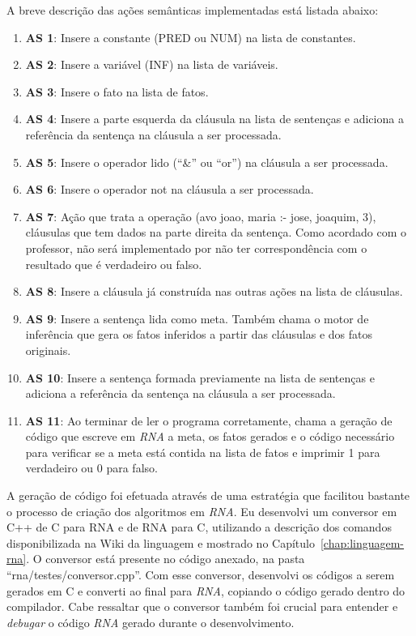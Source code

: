A breve descrição das ações semânticas implementadas está listada abaixo:

\begin{enumerate}
	\item \textbf{AS 1}: Insere a constante (PRED ou NUM) na lista de constantes.
	\item \textbf{AS 2}: Insere a variável (INF) na lista de variáveis.
	\item \textbf{AS 3}: Insere o fato na lista de fatos.
	\item \textbf{AS 4}: Insere a parte esquerda da cláusula na lista de sentenças e adiciona a referência da sentença na cláusula a ser processada.
	\item \textbf{AS 5}: Insere o operador lido (``\&'' ou ``or'') na cláusula a ser processada.
	\item \textbf{AS 6}: Insere o operador not na cláusula a ser processada.
	\item \textbf{AS 7}: Ação que trata a operação (avo joao, maria :- jose, joaquim, 3), cláusulas que tem dados na parte direita da sentença. Como acordado com o professor, não será implementado por não ter correspondência com o resultado que é verdadeiro ou falso.
	\item \textbf{AS 8}: Insere a cláusula já construída nas outras ações na lista de cláusulas.
	\item \textbf{AS 9}: Insere a sentença lida como meta. Também chama o motor de inferência que gera os fatos inferidos a partir das cláusulas e dos fatos originais.
	\item \textbf{AS 10}: Insere a sentença formada previamente na lista de sentenças e adiciona a referência da sentença na cláusula a ser processada.
	\item \textbf{AS 11}: Ao terminar de ler o programa corretamente, chama a geração de código que escreve em \emph{RNA} a meta, os fatos gerados e o código necessário para verificar se a meta está contida na lista de fatos e imprimir 1 para verdadeiro ou 0 para falso.
\end{enumerate}

A geração de código foi efetuada através de uma estratégia que facilitou bastante o processo de criação dos algoritmos em \emph{RNA}. Eu desenvolvi um conversor em C++ de C para RNA e de RNA para C, utilizando a descrição dos comandos disponibilizada na Wiki da linguagem e mostrado no Capítulo~\ref{chap:linguagem-rna}. O conversor está presente no código anexado, na pasta ``rna/testes/conversor.cpp''. Com esse conversor, desenvolvi os códigos a serem gerados em C e converti ao final para \emph{RNA}, copiando o código gerado dentro do compilador. Cabe ressaltar que o conversor também foi crucial para entender e \emph{debugar} o código \emph{RNA} gerado durante o desenvolvimento.
